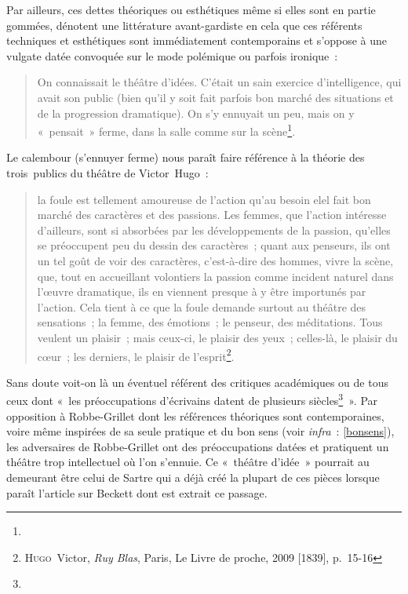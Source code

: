 \documentclass[12pt, a4paper]{article}
\begin{document}

Par ailleurs, ces dettes théoriques ou esthétiques même si elles sont en partie gommées, dénotent une littérature avant-gardiste en cela que ces référents techniques et esthétiques sont immédiatement contemporains et s'oppose à une vulgate datée convoquée sur le mode polémique ou parfois ironique~:
\begin{quote}
    On connaissait le théâtre d’idées. C’était un sain exercice d’intelligence, qui avait son public (bien qu’il y soit fait parfois bon marché des situations et de la progression dramatique). On s’y ennuyait un peu, mais on y «~pensait~» ferme, dans la salle comme sur la scène\footnote{}.
\end{quote}
Le calembour (s'ennuyer ferme) nous paraît faire référence à la théorie des trois~publics du théâtre de Victor~Hugo~:
\begin{quote}
    la foule est tellement amoureuse de l'action qu'au besoin elel fait bon marché des caractères et des passions. Les femmes, que l'action intéresse d'ailleurs, sont si absorbées par les développements de la passion, qu'elles se préoccupent peu du dessin des caractères~; quant aux penseurs, ils ont un tel goût de voir des caractères, c'est-à-dire des hommes, vivre la scène, que, tout en accueillant volontiers la passion comme incident naturel dans l'œuvre dramatique, ils en viennent presque à y être importunés par l'action. Cela tient à ce que la foule demande surtout au théâtre des sensations~; la femme, des émotions~; le penseur, des méditations. Tous veulent un plaisir~; mais ceux-ci, le plaisir des yeux~; celles-là, le plaisir du cœur~; les derniers, le plaisir de l'esprit\footnote{\textsc{Hugo}~Victor, \textit{Ruy Blas}, Paris, Le Livre de proche, 2009 [1839], p.~15-16}.
\end{quote}
Sans doute voit-on là un éventuel référent des critiques académiques ou de tous ceux dont «~les préoccupations d’écrivains datent de plusieurs siècles\footnote{}~». Par opposition à Robbe-Grillet dont les références théoriques sont contemporaines, voire même inspirées de sa seule pratique et du bon sens (voir \textit{infra}~: \ref{bonsens}), les adversaires de Robbe-Grillet ont des préoccupations datées et pratiquent un théâtre trop intellectuel où l'on s'ennuie. Ce «~théâtre d'idée~» pourrait au demeurant être celui de Sartre qui a déjà créé la plupart de ces pièces lorsque paraît l'article sur Beckett dont est extrait ce passage.
\end{document}
